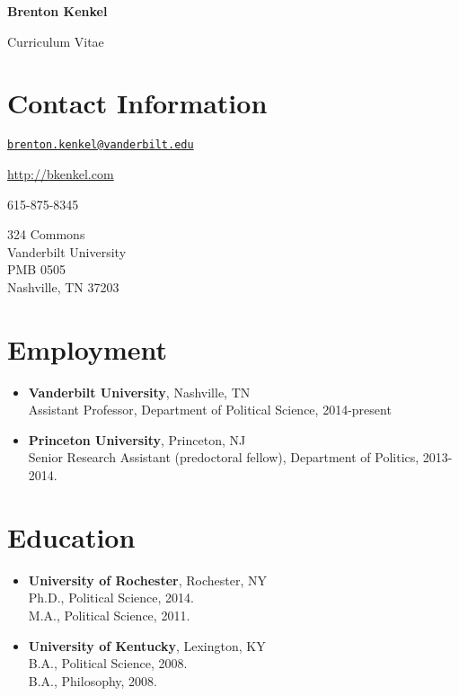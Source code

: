 \documentclass[11pt]{article}
\providecommand{\tightlist}{%
  \setlength{\itemsep}{0pt}\setlength{\parskip}{0pt}}
\begin{document}
\begin{center}
  {%
    \huge\bf%
    Brenton Kenkel%
  }%

  \vspace{0.5em}

  {%
    \Large%
    Curriculum Vitae%
  }%
\end{center}

\section{Contact Information}\label{contact-information}

\begin{description}
\tightlist
\item[Email]
\href{mailto:brenton.kenkel@vanderbilt.edu}{\texttt{brenton.kenkel@vanderbilt.edu}}
\item[Web]
\url{http://bkenkel.com}
\item[Phone]
615-875-8345
\item[Mailing]
324 Commons\\
Vanderbilt University\\
PMB 0505\\
Nashville, TN 37203
\end{description}

\section{Employment}\label{employment}

\begin{itemize}
\item
  \textbf{Vanderbilt University}, Nashville, TN\\
  Assistant Professor, Department of Political Science, 2014-present
\item
  \textbf{Princeton University}, Princeton, NJ\\
  Senior Research Assistant (predoctoral fellow), Department of
  Politics, 2013-2014.
\end{itemize}

\section{Education}\label{education}

\begin{itemize}
\item
  \textbf{University of Rochester}, Rochester, NY\\
  Ph.D., Political Science, 2014.\\
  M.A., Political Science, 2011.
\item
  \textbf{University of Kentucky}, Lexington, KY\\
  B.A., Political Science, 2008.\\
  B.A., Philosophy, 2008.
\end{itemize}
\end{document}
